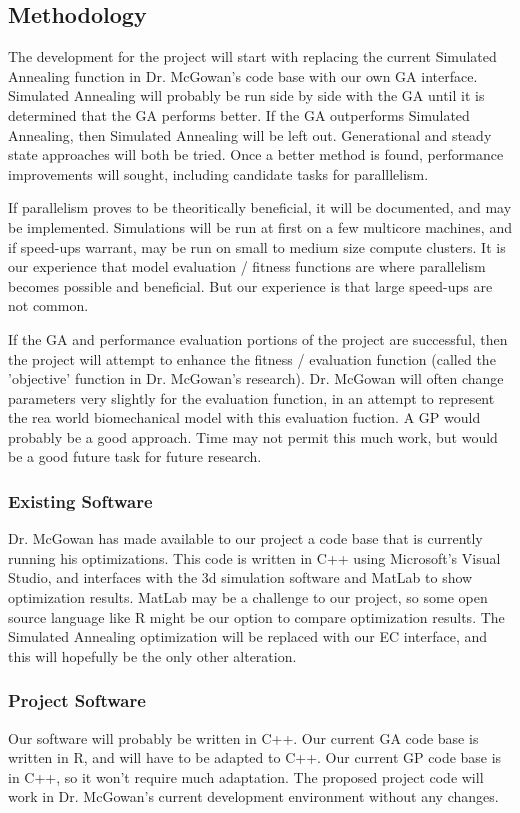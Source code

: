 \subsection{Methodology}
The development for the project will start with replacing the current 
Simulated Annealing function in Dr. McGowan's code base with our own GA 
interface. Simulated Annealing will probably be run side by side with the GA
until it is determined that the GA performs better. If the GA outperforms 
Simulated Annealing, then Simulated Annealing will be left out. Generational 
and steady state approaches will both be tried. Once a better method is found,
performance improvements will sought, including candidate tasks for 
paralllelism.

If parallelism proves to be theoritically beneficial, it will be documented, 
and may be implemented. Simulations will be run at first on a few multicore 
machines, and if speed-ups warrant, may be run on small to medium size 
compute clusters. It is our experience that model evaluation / fitness 
functions are where parallelism becomes possible and beneficial. But our 
experience is that large speed-ups are not common.

If the GA and performance evaluation portions of the project are successful,
then the project will attempt to enhance the fitness / evaluation function 
(called the 'objective' function in Dr. McGowan's research). Dr. McGowan will
often change parameters very slightly for the evaluation function, in an 
attempt to represent the rea world biomechanical model with this evaluation 
fuction. A GP would probably be a good approach. Time may not permit this much
work, but would be a good future task for future research.

\subsubsection{Existing Software}
Dr. McGowan has made available to our project a code base that is currently
running his optimizations. This code is written in C++ using Microsoft's 
Visual Studio, and interfaces with the 3d simulation software and MatLab to
show optimization results. MatLab may be a challenge to our project, so some
open source language like R might be our option to compare optimization 
results. The Simulated Annealing optimization will be replaced with our EC
interface, and this will hopefully be the only other alteration.

\subsubsection{Project Software}
Our software will probably be written in C++. Our current GA code base is 
written in R, and will have to be adapted to C++. Our current GP code base is
in C++, so it won't require much adaptation. The proposed project code will 
work in Dr. McGowan's current development environment without any changes.

